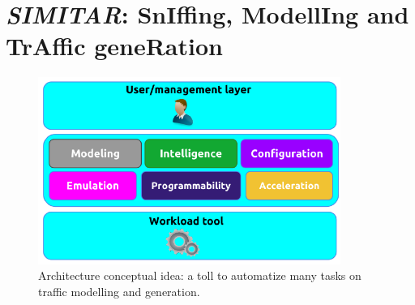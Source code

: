 



\section{\textit{SIMITAR}: SnIffing, ModellIng and TrAffic geneRation}

\begin{figure}[ht!]
        \centering
        \includegraphics[height=2.4in]{figures/ch1/layer-diagram}
        \caption{ Architecture conceptual idea: a toll to automatize many tasks on traffic modelling and generation.}
    \label{fig:layer-diagram}
\end{figure}

